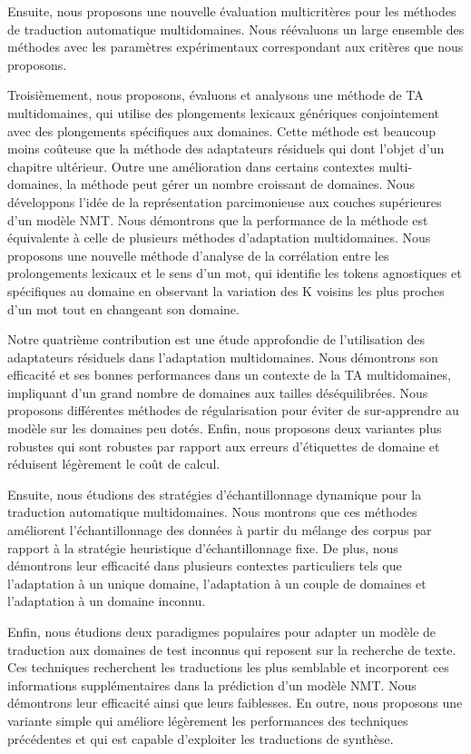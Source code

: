 Ensuite, nous proposons une nouvelle évaluation multicritères pour les méthodes de traduction automatique multidomaines. Nous réévaluons un large ensemble des méthodes avec les paramètres expérimentaux correspondant aux critères que nous proposons.

Troisièmement, nous proposons, évaluons et analysons une méthode de TA multidomaines, qui utilise des plongements lexicaux génériques conjointement avec des plongements spécifiques aux domaines. Cette méthode est beaucoup moins coûteuse que la méthode des adaptateurs résiduels qui dont l'objet d'un chapitre ultérieur. Outre une amélioration dans certains contextes multi-domaines, la méthode peut gérer un nombre croissant de domaines. Nous développons l'idée de la représentation parcimonieuse aux couches supérieures d'un modèle NMT. Nous démontrons que la performance de la méthode est équivalente à celle de plusieurs méthodes d'adaptation multidomaines. Nous proposons une nouvelle méthode d'analyse de la corrélation entre les prolongements lexicaux et le sens d'un mot, qui identifie les tokens agnostiques et spécifiques au domaine en observant la variation des K voisins les plus proches d'un mot tout en changeant son domaine.

Notre quatrième contribution est une étude approfondie de l'utilisation des adaptateurs résiduels dans l'adaptation multidomaines. Nous démontrons son efficacité et ses bonnes performances dans un contexte de la TA multidomaines, impliquant d'un grand nombre de domaines aux tailles déséquilibrées. Nous proposons différentes méthodes de régularisation pour éviter de sur-apprendre au modèle sur les domaines peu dotés. Enfin, nous proposons deux variantes plus robustes qui sont robustes par rapport aux erreurs d'étiquettes de domaine et réduisent légèrement le coût de calcul.

Ensuite, nous étudions des stratégies d'échantillonnage dynamique pour la traduction automatique multidomaines. Nous montrons que ces méthodes améliorent l'échantillonnage des données à partir du mélange des corpus par rapport à la stratégie heuristique d'échantillonnage fixe. De plus, nous démontrons leur efficacité dans plusieurs contextes particuliers tels que l'adaptation à un unique domaine, l'adaptation à un couple de domaines et l'adaptation à un domaine inconnu.

Enfin, nous étudions deux paradigmes populaires pour adapter un modèle de traduction aux domaines de test inconnus qui reposent sur la recherche de texte. Ces techniques recherchent les traductions les plus semblable et incorporent ces informations supplémentaires dans la prédiction d'un modèle NMT. Nous démontrons leur efficacité ainsi que leurs faiblesses. En outre, nous proposons une variante simple qui améliore légèrement les performances des techniques précédentes et qui est capable d'exploiter les traductions de synthèse.

